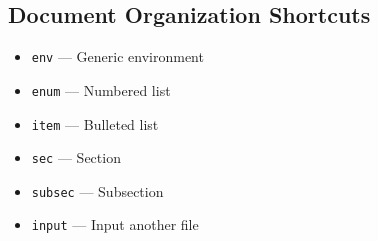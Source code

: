 \documentclass{article}
\begin{document}
\subsection{Document Organization Shortcuts}

\begin{itemize}
    \item \texttt{env} --- Generic environment
    \item \texttt{enum} --- Numbered list
    \item \texttt{item} --- Bulleted list
    \item \texttt{sec} --- Section
    \item \texttt{subsec} --- Subsection
    \item \texttt{input} --- Input another file
\end{itemize}
\end{document}
